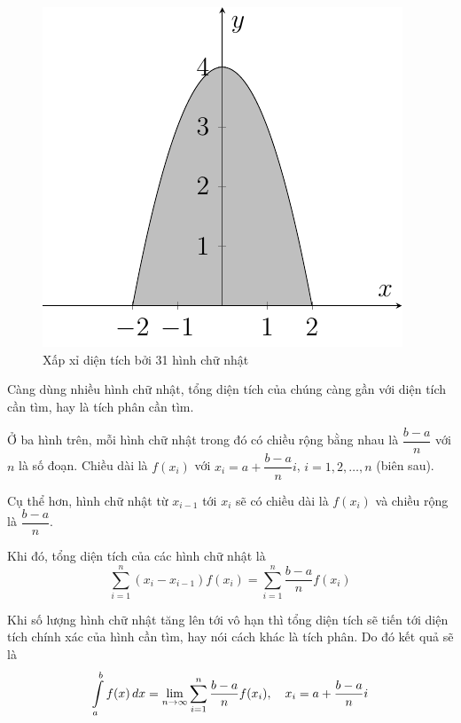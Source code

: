 \begin{figure}[htb]
	\centering
	\includegraphics[page=4]{analytic_geometry/int1.pdf}
	\caption{Xấp xỉ diện tích bởi 31 hình chữ nhật}
	\label{int4}
\end{figure}

Càng dùng nhiều hình chữ nhật, tổng diện tích của chúng càng gần với diện tích cần tìm, hay là tích phân cần tìm.

Ở ba hình trên, mỗi hình chữ nhật trong đó có chiều rộng bằng nhau là $\dfrac{b-a}{n}$ với $n$ là số đoạn. Chiều dài là $f(x_i)$ với $x_i = a + \dfrac{b-a}{n} i$, $i = 1, 2, \ldots, n$ (biên sau).

Cụ thể hơn, hình chữ nhật từ $x_{i-1}$ tới $x_i$ sẽ có chiều dài là $f(x_i)$ và chiều rộng là $\dfrac{b-a}{n}$. %

Khi đó, tổng diện tích của các hình chữ nhật là
\begin{equation}
	\sum_{i=1}^n (x_{i} - x_{i-1}) f(x_i) = \sum_{i=1}^n \frac{b-a}{n} f(x_i)
\end{equation}

Khi số lượng hình chữ nhật tăng lên tới vô hạn thì tổng diện tích sẽ tiến tới diện tích chính xác của hình cần tìm, hay nói cách khác là tích phân. Do đó kết quả sẽ là
\begin{equation}
	\int\displaylimits_{a}^{b} f(x)\,dx = \lim_{n \to \infty} \sum_{i=1}^{n} \frac{b-a}{n} f(x_i), \quad x_i = a + \frac{b-a}{n} i
\end{equation}

